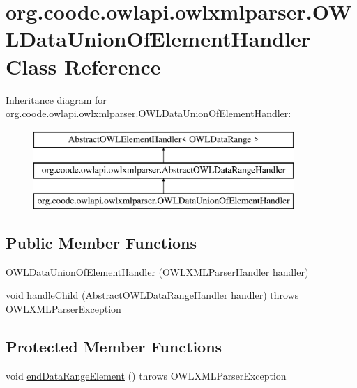 \hypertarget{classorg_1_1coode_1_1owlapi_1_1owlxmlparser_1_1_o_w_l_data_union_of_element_handler}{\section{org.\-coode.\-owlapi.\-owlxmlparser.\-O\-W\-L\-Data\-Union\-Of\-Element\-Handler Class Reference}
\label{classorg_1_1coode_1_1owlapi_1_1owlxmlparser_1_1_o_w_l_data_union_of_element_handler}
}
Inheritance diagram for org.\-coode.\-owlapi.\-owlxmlparser.\-O\-W\-L\-Data\-Union\-Of\-Element\-Handler\-:\begin{figure}[H]
\begin{center}
\leavevmode
\includegraphics[height=3.000000cm]{classorg_1_1coode_1_1owlapi_1_1owlxmlparser_1_1_o_w_l_data_union_of_element_handler}
\end{center}
\end{figure}
\subsection*{Public Member Functions}
\begin{DoxyCompactItemize}
\item 
\hyperlink{classorg_1_1coode_1_1owlapi_1_1owlxmlparser_1_1_o_w_l_data_union_of_element_handler_a53192e2dbe1f18a03f248b27b7810627}{O\-W\-L\-Data\-Union\-Of\-Element\-Handler} (\hyperlink{classorg_1_1coode_1_1owlapi_1_1owlxmlparser_1_1_o_w_l_x_m_l_parser_handler}{O\-W\-L\-X\-M\-L\-Parser\-Handler} handler)
\item 
void \hyperlink{classorg_1_1coode_1_1owlapi_1_1owlxmlparser_1_1_o_w_l_data_union_of_element_handler_a091f8da0a7481fd6cb414f4b44f1b9f4}{handle\-Child} (\hyperlink{classorg_1_1coode_1_1owlapi_1_1owlxmlparser_1_1_abstract_o_w_l_data_range_handler}{Abstract\-O\-W\-L\-Data\-Range\-Handler} handler)  throws O\-W\-L\-X\-M\-L\-Parser\-Exception 
\end{DoxyCompactItemize}
\subsection*{Protected Member Functions}
\begin{DoxyCompactItemize}
\item 
void \hyperlink{classorg_1_1coode_1_1owlapi_1_1owlxmlparser_1_1_o_w_l_data_union_of_element_handler_ae9e56604087eec3873d744b9a45a9a01}{end\-Data\-Range\-Element} ()  throws O\-W\-L\-X\-M\-L\-Parser\-Exception 
\end{DoxyCompactItemize}
